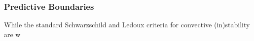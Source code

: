 {\color{brown}
\subsubsection{Predictive Boundaries}

While the standard Schwarzschild and Ledoux criteria for convective (in)stability are w

}